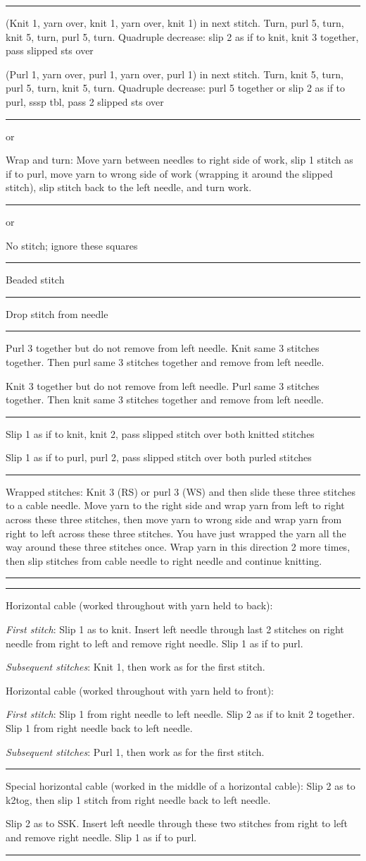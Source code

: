 \documentclass{amsart}
\newlength{\symbolcolwidth}
\newlength{\singlecolwidth}
\newlength{\doublecolwidth}
\newcommand{\setcolwidths}[1]{
	\setlength{\symbolcolwidth}{#1}
	\addtolength{\symbolcolwidth}{1pt}
	\setlength{\doublecolwidth}{\textwidth}
	\addtolength{\doublecolwidth}{-4\tabcolsep}
	\addtolength{\doublecolwidth}{-1.2pt} %
	\addtolength{\doublecolwidth}{-\symbolcolwidth}
	\setlength{\singlecolwidth}{0.5\doublecolwidth}
	\addtolength{\singlecolwidth}{-1\tabcolsep}
	\addtolength{\singlecolwidth}{-0.2pt} %
	}
\newcommand\keyrow[3]{\par\allowbreak\hrule\par\nopagebreak\noindent
	\vrule\hfill 
	\begin{minipage}{\symbolcolwidth}\centering#1\end{minipage}%
	\hfill\vrule\hfill
	\begin{minipage}{\singlecolwidth}
		\raisebox{1pt}{\strut}#2\raisebox{-1pt}{\strut}\end{minipage}%
	\hfill\vrule\hfill
	\begin{minipage}{\singlecolwidth}
		\raisebox{1pt}{\strut}#3\raisebox{-1pt}{\strut}\end{minipage}%
	\hfill\vrule
	\par\nointerlineskip}
\newcommand\dblkeyrow[2]{\par\allowbreak\hrule\par\nopagebreak\noindent
	\vrule\hfill
	\begin{minipage}{\symbolcolwidth}\centering#1\end{minipage}%
	\hfill\vrule\hfill
	\begin{minipage}{\doublecolwidth}
		\raisebox{1pt}{\strut}#2\raisebox{-1pt}{\strut}\end{minipage}%
	\hfill\vrule
	\par\nointerlineskip}
\begin{document}
\begin{fullpages}
\keyrow{}
{(Knit 1, yarn over, knit 1, yarn over, knit 1) in next stitch. Turn, purl 5, turn, knit 5, turn, purl 5, turn. Quadruple decrease: slip 2 as if to knit, knit 3 together, pass slipped sts over}
{(Purl 1, yarn over, purl 1, yarn over, purl 1) in next stitch. Turn, knit 5, turn, purl 5, turn, knit 5, turn. Quadruple decrease: purl 5 together or slip 2 as if to purl, sssp tbl, pass 2 slipped sts over}
\dblkeyrow{ or }{Wrap and turn: Move yarn between needles to right side of work, slip 1 stitch as if to purl, move yarn to wrong side of work (wrapping it around the slipped stitch), slip stitch back to the left needle, and turn work.}
\ifgrid\dblkeyrow{\textknit{,} or }{No stitch; ignore these squares} \fi
\dblkeyrow{}{Beaded stitch}
\dblkeyrow{}{Drop stitch from needle}
\keyrow{}{Purl 3 together but do not remove from left needle. Knit same 3 stitches together. Then purl same 3 stitches together and remove from left needle.}{Knit 3 together but do not remove from left needle. Purl same 3 stitches together. Then knit same 3 stitches together and remove from left needle.}
\keyrow{}{Slip 1 as if to knit, knit 2, pass slipped stitch over both knitted stitches}{Slip 1 as if to purl, purl 2, pass slipped stitch over both purled stitches}
\dblkeyrow{}{Wrapped stitches: Knit 3 (RS) or purl 3 (WS) and then slide these three stitches to a cable needle. Move yarn to the right side and wrap yarn from left to right across these three stitches, then move yarn to wrong side and wrap yarn from right to left across these three stitches. You have just wrapped the yarn all the way around these three stitches once. Wrap yarn in this direction 2 more times, then slip stitches from cable needle to right needle and continue knitting.}
\hrule

\clearpage

\setcolwidths{3\stitchwd}

\keyrow{\textknit{+++}}
{Horizontal cable (worked throughout with yarn held to back):
\par\emph{First stitch}: Slip 1 as to knit. Insert left needle through  last 2 stitches on right needle from right to left and remove right needle. Slip 1 as if to purl.
\par\emph{Subsequent stitches}: Knit 1, then work as for the first stitch.}
{Horizontal cable (worked throughout with yarn held to front):
\par\emph{First stitch}: Slip 1 from right needle to left needle. Slip 2 as if to knit 2 together. Slip 1 from right needle back to left needle.
\par\emph{Subsequent stitches}: Purl 1, then work as for the first stitch.}
\keyrow{\textknit{/}}
{Special horizontal cable (worked in the middle of a horizontal cable): Slip 2 as to k2tog, then slip 1 stitch from right needle back to left needle.}
{Slip 2 as to SSK. Insert left needle through these two stitches from right to left and remove right needle. Slip 1 as if to purl.}
\hrule


\end{fullpages}
\end{document}
